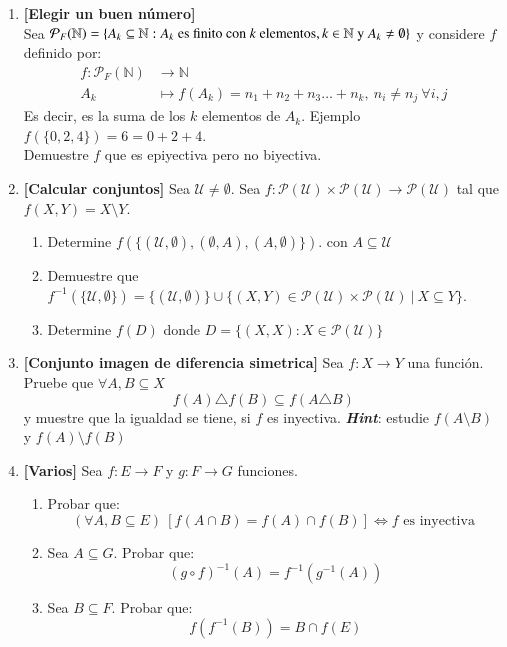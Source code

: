 \documentclass[letterpaper,11pt]{article}
\newcommand{\N}{\mathbb N}
\newcommand{\U}{\mathcal U}
\newcommand{\ssi}{\Longleftrightarrow} %
\theoremstyle{plain}
\begin{document}
\begin{enumerate}[\bf P1.]
    \item \textbf{[Elegir un buen número]}\\
        Sea $\mathcal{P}_{F}(\N)=\{A_{k} \subseteq \N : A_{k} \text{ es finito con \textit{k} elementos}, k \in \N \text{ y } A_{k} \neq \emptyset  \}$ y considere $f$ definido por:
        \begin{align*}
            f \colon \mathcal{P}_{F}(\N) &\to \N\\      
            A_{k} &\mapsto f(A_{k})=n_{1}+n_{2}+n_{3}\dots+n_{k}, ~ n_{i}\neq n_{j} ~ \forall i,j
            \end{align*}
        Es decir, es la suma de los $k$ elementos de $A_{k}$. Ejemplo $f(\{0,2,4\})=6=0+2+4$.\\
        Demuestre $f$ que es epiyectiva pero no biyectiva.
    
    \item \textbf{[Calcular conjuntos]} Sea $\U \neq \emptyset$. Sea $f: \mathcal{P}(\U) \times \mathcal{P}(\U) \to \mathcal{P}(\U)$ tal que $f(X,Y)=X\setminus Y$.
        \begin{enumerate}
            \item Determine $f(\{(\U,\emptyset), (\emptyset, A), (A,\emptyset)  \})$. con $A \subseteq \U$
            \item Demuestre que $f^{-1}(\{\U,\emptyset \})=\{( \U,\emptyset )\} \cup \{(X,Y) \in \mathcal{P}(\U) \times \mathcal{P}(\U) ~|~ X\subseteq Y \}$.
            \item Determine $f(D)$ donde $D=\{(X,X) : X \in \mathcal{P}(\U) \}$
        \end{enumerate}
        
    \item \textbf{[Conjunto imagen de diferencia simetrica]} Sea $f:X\to Y$ una función. Pruebe que $\forall A,B \subseteq X$
        $$f(A)\triangle f(B) \subseteq f(A\triangle B)$$
    y muestre que la igualdad se tiene, si $f$ es inyectiva.
    \emph{\textbf{Hint}}: estudie $f(A\setminus B)$ y $f(A)\setminus f(B)$
    
    \item  \textbf{[Varios]} Sea $f:E \to F$ y $g:F \to G$ funciones.
        \begin{enumerate}
            \item Probar que:
                $$ (\forall A,B \subseteq E) ~ [f(A \cap B)=f(A) \cap f(B)] \ssi f \text{ es inyectiva } $$
            \item Sea $A \subseteq G$. Probar que:
                $$ (g \circ f)^{-1}(A)=f^{-1}(g^{-1}(A)) $$
            \item Sea $B \subseteq F$. Probar que:
                $$ f(f^{-1}(B))=B \cap f(E) $$
        \end{enumerate}
        

\end{enumerate}
\end{document}
